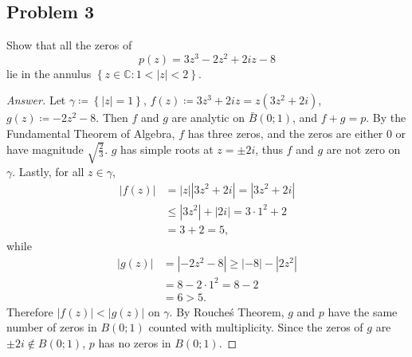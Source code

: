 \documentclass[12pt]{article}
\newcommand{\cx}{\mathbb{C}}
\newcommand\paren[1]{\left( #1 \right)}
\newcommand\setb[1]{\left \{ #1 \right \}}
\newcommand{\abs}[1]{\left| #1 \right|}
\theoremstyle{definition}
\begin{document}
\subsection{Problem 3}
Show that all the zeros of 
\[
    p(z) = 3z^3 - 2z^2 + 2iz - 8
\]
lie in the annulus $\setb{z \in \cx : 1 < |z| < 2}$.
\begin{proof}[Answer]
    Let $\gamma \coloneqq \setb{ |z| = 1 }$, $f(z) \coloneqq 3z^3 + 2iz = z \paren{3z^2 + 2i}$, $g(z) \coloneqq -2z^2 - 8$. Then $f$ and $g$ are analytic on $\bar{B}(0;1)$, and $f + g = p$. By the Fundamental Theorem of Algebra, $f$ has three zeros, and the zeros are either $0$ or have magnitude $\sqrt{\frac{2}{3}}$. $g$ has simple roots at $z = \pm 2i$, thus $f$ and $g$ are not zero on $\gamma$. Lastly, for all $z \in \gamma$,
    \begin{align*}
        \abs{ f(z) } & = \abs{z} \abs{3z^2 + 2i} = \abs{3z^2 + 2i} \\
        & \leq \abs{3z^2} + \abs{2i} = 3 \cdot1^2 + 2 \\
        & = 3 + 2 = 5,
    \end{align*}
    while
    \begin{align*}
        \abs{ g(z) } & = \abs{ -2z^2 - 8} \geq \abs{-8} - \abs{2z^2} \\
        & = 8 - 2\cdot1^2 = 8 - 2 \\
        & = 6 > 5.
    \end{align*}
    Therefore $|f(z)| < |g(z)|$ on $\gamma$. By Rouche\'s Theorem, $g$ and $p$ have the same number of zeros in $B(0;1)$ counted with multiplicity. Since the zeros of $g$ are $\pm 2i \notin B(0;1)$, $p$ has no zeros in $B(0;1)$.
    

\end{proof}
\end{document}
